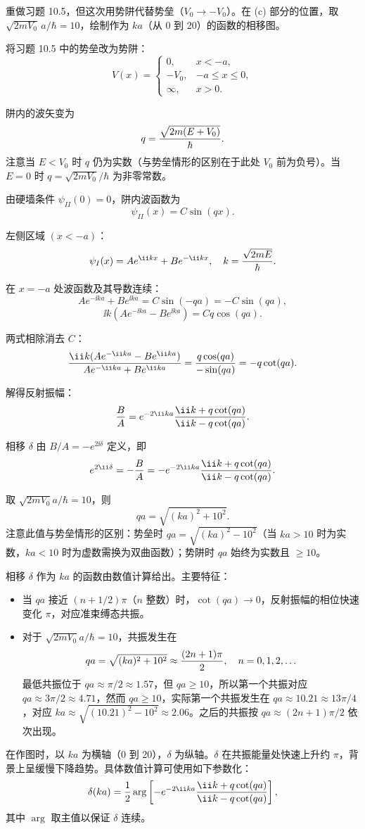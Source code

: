 \begin{question}
重做习题 10.5，但这次用势阱代替势垒（$V_0\to -V_0$）。在 (c) 部分的位置，取 $\sqrt{2mV_0}\,a/\hbar=10$，绘制作为 $ka$（从 0 到 20）的函数的相移图。
\end{question}
\begin{solution}
将习题 10.5 中的势垒改为势阱：
\[
V(x)=\begin{cases}
0,&x<-a,\\
-V_0,&-a\le x\le 0,\\
\infty,&x>0.
\end{cases}
\]

阱内的波矢变为
\[
q={\sqrt{2m(E+V_0)}\over\hbar}.
\]
注意当 $E<V_0$ 时 $q$ 仍为实数（与势垒情形的区别在于此处 $V_0$ 前为负号）。当 $E=0$ 时 $q=\sqrt{2mV_0}/\hbar$ 为非零常数。

由硬墙条件 $\psi_{II}(0)=0$，阱内波函数为
\[
\psi_{II}(x)=C\sin(qx).
\]

左侧区域 $(x<-a)$：
\[
\psi_I(x)=Ae^{\ii kx}+Be^{-\ii kx},\quad k={\sqrt{2mE}\over\hbar}.
\]

在 $x=-a$ 处波函数及其导数连续：
\[
Ae^{-\ii ka}+Be^{\ii ka}=C\sin(-qa)=-C\sin(qa),
\]
\[
\ii k(Ae^{-\ii ka}-Be^{\ii ka})=Cq\cos(qa).
\]

两式相除消去 $C$：
\[
{\ii k(Ae^{-\ii ka}-Be^{\ii ka})\over Ae^{-\ii ka}+Be^{\ii ka}}={q\cos(qa)\over-\sin(qa)}=-q\cot(qa).
\]

解得反射振幅：
\[
{B\over A}=e^{-2\ii ka}{\ii k+q\cot(qa)\over\ii k-q\cot(qa)}.
\]

相移 $\delta$ 由 $B/A=-e^{2\ii\delta}$ 定义，即
\[
e^{2\ii\delta}=-{B\over A}=-e^{-2\ii ka}{\ii k+q\cot(qa)\over\ii k-q\cot(qa)}.
\]

取 $\sqrt{2mV_0}a/\hbar=10$，则
\[
qa=\sqrt{(ka)^2+10^2}.
\]
注意此值与势垒情形的区别：势垒时 $qa=\sqrt{(ka)^2-10^2}$（当 $ka>10$ 时为实数，$ka<10$ 时为虚数需换为双曲函数）；势阱时 $qa$ 始终为实数且 $\ge10$。

相移 $\delta$ 作为 $ka$ 的函数由数值计算给出。主要特征：
\begin{itemize}
\item 当 $q a$ 接近 $(n+1/2)\pi$（$n$ 整数）时，$\cot(qa)\to0$，反射振幅的相位快速变化 $\pi$，对应准束缚态共振。
\item 对于 $\sqrt{2mV_0}a/\hbar=10$，共振发生在
\[
qa=\sqrt{(ka)^2+10^2}\approx {(2n+1)\pi\over2},\quad n=0,1,2,\ldots
\]
最低共振位于 $qa\approx\pi/2\approx1.57$，但 $qa\ge10$，所以第一个共振对应 $qa\approx 3\pi/2\approx4.71$，然而 $qa\ge10$，实际第一个共振发生在 $qa\approx 10.21\approx13\pi/4$，对应 $ka\approx\sqrt{(10.21)^2-10^2}\approx2.06$。之后的共振按 $qa\approx (2n+1)\pi/2$ 依次出现。
\end{itemize}

在作图时，以 $ka$ 为横轴（0 到 20），$\delta$ 为纵轴。$\delta$ 在共振能量处快速上升约 $\pi$，背景上呈缓慢下降趋势。具体数值计算可使用如下参数化：
\[
\delta(ka)={1\over2}\arg\left[-e^{-2\ii ka}{\ii k+q\cot(qa)\over\ii k-q\cot(qa)}\right],
\]
其中 $\arg$ 取主值以保证 $\delta$ 连续。
\end{solution}
